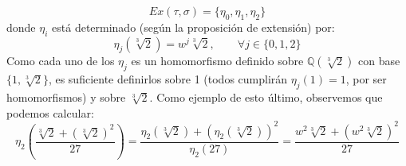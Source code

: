 \begin{ejemplo}
    \begin{equation*}
        Ex(\tau,\sigma) = \{\eta_0,\eta_1,\eta_2\}
    \end{equation*}
    donde $\eta_i$ está determinado (según la proposición de extensión) por:
    \begin{equation*}
        \eta_j\left(\sqrt[3]{2}\right) = w^j \sqrt[3]{2}, \qquad \forall j \in \{0,1,2\}
    \end{equation*}
    Como cada uno de los $\eta_j$ es un homomorfismo definido sobre $\mathbb{Q}\left(\sqrt[3]{2}\right)$ con base $\{1,\sqrt[3]{2}\}$, es suficiente definirlos sobre 1 (todos cumplirán $\eta_j(1)=1$, por ser homomorfismos) y sobre $\sqrt[3]{2}$. Como ejemplo de esto último, observemos que podemos calcular:
    \begin{equation*}
        \eta_2\left(\frac{{\sqrt[3]{2}+(\sqrt[3]{2})}^{2}}{27}\right) = \dfrac{\eta_2(\sqrt[3]{2}) + {\left(\eta_2\left(\sqrt[3]{2}\right)\right)}^{2}}{\eta_2(27)} = \dfrac{w^2 \sqrt[3]{2} + {\left(w^2\sqrt[3]{2}\right)}^{2}}{27} 
    \end{equation*} 
\end{ejemplo}

